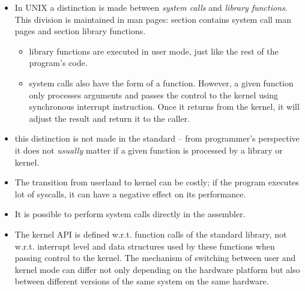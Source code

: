
\begin{slide}
\begin{itemize}
\item In UNIX a distinction is made between \emph{system calls} and \emph{library
functions}. This division is maintained in man pages: section  contains
system call man pages and section  library functions.
    \begin{itemize}
    \item library functions are executed in user mode, just like the rest
    of the program's code.
    \item system calls also have the form of a function. However, a given function
    only processes arguments and passes the control to the kernel using
    synchronous interrupt instruction. Once it returns from the kernel,
    it will adjust the result and return it to the caller.
    \end{itemize}
\item this distinction is not made in the standard -- from programmer's
perspective it does not \emph{usually} matter if a given function is processed
by a library or kernel.
\end{itemize}
\end{slide}

\begin{itemize}
\item The transition from userland to kernel can be costly; if the program
executes lot of syscalls, it can have a negative effect on its performance.
\item It is possible to perform system calls directly in the assembler.
\item The kernel API is defined w.r.t. function calls of the standard library,
not w.r.t. interrupt level and data structures used by these functions when
passing control to the kernel. The mechanism of switching between user and
kernel mode can differ not only depending on the hardware platform but also between
different versions of the same system on the same hardware.
\end{itemize}



